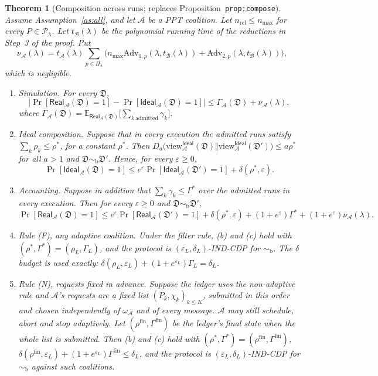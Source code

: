 \documentclass[11pt]{article}
\theoremstyle{definition}
\theoremstyle{plain}
\newtheorem{theorem}[definition]{Theorem}
\newcommand{\Ex}{\mathbb{E}}
\newcommand{\view}{\mathrm{view}}
\newcommand{\bD}{\mathfrak D}
\newcommand{\Real}{\mathsf{Real}}
\newcommand{\Ideal}{\mathsf{Ideal}}
\newcommand{\Adv}{\mathrm{Adv}}
\newcommand{\nrel}{n_{\mathrm{rel}}}
\newcommand{\simb}{\sim_{\mathrm b}}
\begin{document}
\begin{theorem}[Composition across runs; replaces Proposition~\texttt{prop:compose}]\label{thm:main}
Assume Assumption~\ref{as:all}, and let $\mathcal A$ be a PPT coalition. Let $\nrel\le n_{\max}$ for every $P\in\mathcal P_\lambda$. Let $t_{\mathcal B}(\lambda)$ be the polynomial running time of the reductions in Step~3 of the proof. Put
\[
  \nu_{\mathcal A}(\lambda)=t_{\mathcal A}(\lambda)\sum_{p\in\Pi_\lambda}\bigl(n_{\max}\Adv_{1,p}(\lambda,t_{\mathcal B}(\lambda))+\Adv_{2,p}(\lambda,t_{\mathcal B}(\lambda))\bigr),
\]
which is negligible.
\begin{enumerate}[label=(\alph*)]
  \item \emph{Simulation.} For every $\bD$,
  \[
    \bigl|\Pr[\Real_{\mathcal A}(\bD)=1]-\Pr[\Ideal_{\mathcal A}(\bD)=1]\bigr|\le\Gamma_{\mathcal A}(\bD)+\nu_{\mathcal A}(\lambda),
  \]
  where $\Gamma_{\mathcal A}(\bD)=\Ex_{\Real_{\mathcal A}(\bD)}\bigl[\sum_{k\ \mathrm{admitted}}\gamma_k\bigr]$.
  \item \emph{Ideal composition.} Suppose that in every execution the admitted runs satisfy $\sum_k\rho_k\le\rho^*$, for a constant $\rho^*$. Then $D_a\bigl(\view^{\Ideal}_{\mathcal A}(\bD)\Vert\view^{\Ideal}_{\mathcal A}(\bD')\bigr)\le a\rho^*$ for all $a>1$ and $\bD\simb\bD'$. Hence, for every $\varepsilon\ge0$,
  \[
    \Pr[\Ideal_{\mathcal A}(\bD)=1]\le e^\varepsilon\Pr[\Ideal_{\mathcal A}(\bD')=1]+\delta(\rho^*,\varepsilon).
  \]
  \item \emph{Accounting.} Suppose in addition that $\sum_k\gamma_k\le\Gamma^*$ over the admitted runs in every execution. Then for every $\varepsilon\ge0$ and $\bD\simb\bD'$,
  \[
    \Pr[\Real_{\mathcal A}(\bD)=1]\le e^\varepsilon\Pr[\Real_{\mathcal A}(\bD')=1]+\delta(\rho^*,\varepsilon)+(1+e^\varepsilon)\Gamma^*+(1+e^\varepsilon)\nu_{\mathcal A}(\lambda).
  \]
  \item \emph{Rule (F), any adaptive coalition.} Under the filter rule, (b) and (c) hold with $(\rho^*,\Gamma^*)=(\rho_L,\Gamma_L)$, and the protocol is $(\varepsilon_L,\delta_L)$-IND-CDP for $\simb$. The $\delta$ budget is used exactly: $\delta(\rho_L,\varepsilon_L)+(1+e^{\varepsilon_L})\Gamma_L=\delta_L$.
  \item \emph{Rule (N), requests fixed in advance.} Suppose the ledger uses the non-adaptive rule and $\mathcal A$'s requests are a fixed list $(P_k,\chi_k)_{k\le K}$, submitted in this order and chosen independently of $\omega_{\mathcal A}$ and of every message. $\mathcal A$ may still schedule, abort and stop adaptively. Let $(\rho^{\mathrm{fin}},\Gamma^{\mathrm{fin}})$ be the ledger's final state when the whole list is submitted. Then (b) and (c) hold with $(\rho^*,\Gamma^*)=(\rho^{\mathrm{fin}},\Gamma^{\mathrm{fin}})$, $\delta(\rho^{\mathrm{fin}},\varepsilon_L)+(1+e^{\varepsilon_L})\Gamma^{\mathrm{fin}}\le\delta_L$, and the protocol is $(\varepsilon_L,\delta_L)$-IND-CDP for $\simb$ against such coalitions.
\end{enumerate}
\end{theorem}
\end{document}
